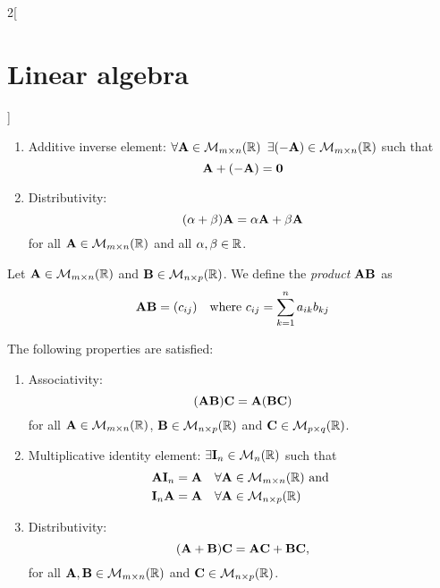 \documentclass[../../../main.tex]{subfiles}
\begin{document}
\begin{multicols}{2}[\section{Linear algebra}]
\begin{prop}
\begin{enumerate}
      \item Additive inverse element: $\forall\boldsymbol{\mathrm{A}}\in\mathcal{M}_{m\times n}(\mathbb{R})$ $\exists(-\boldsymbol{\mathrm{A}})\in\mathcal{M}_{m\times n}(\mathbb{R})$ such that $$\boldsymbol{\mathrm{A}}+(-\boldsymbol{\mathrm{A}})=\boldsymbol{\mathrm{0}}$$
      \item Distributivity: $$(\alpha+\beta)\boldsymbol{\mathrm{A}}=\alpha\boldsymbol{\mathrm{A}}+\beta\boldsymbol{\mathrm{A}}$$ for all $\boldsymbol{\mathrm{A}}\in\mathcal{M}_{m\times n}(\mathbb{R})$ and all $\alpha,\beta\in\mathbb{R}$.
    \end{enumerate}
  \end{prop}
  \begin{definition}
    Let $\boldsymbol{\mathrm{A}}\in\mathcal{M}_{m\times n}(\mathbb{R})$ and $\boldsymbol{\mathrm{B}}\in\mathcal{M}_{n\times p}(\mathbb{R})$. We define the \textit{product $\boldsymbol{\mathrm{A}}\boldsymbol{\mathrm{B}}$} as $$\boldsymbol{\mathrm{A}}\boldsymbol{\mathrm{B}}=(c_{ij})\quad\text{where }c_{ij}=\sum_{k=1}^na_{ik}b_{kj}$$
  \end{definition}
  \begin{prop}
    The following properties are satisfied:
    \begin{enumerate}
      \item Associativity: $$(\boldsymbol{\mathrm{A}}\boldsymbol{\mathrm{B}})\boldsymbol{\mathrm{C}}=\boldsymbol{\mathrm{A}}(\boldsymbol{\mathrm{B}}\boldsymbol{\mathrm{C}})$$ for all $\boldsymbol{\mathrm{A}}\in\mathcal{M}_{m\times n}(\mathbb{R})$, $\boldsymbol{\mathrm{B}}\in\mathcal{M}_{n\times p}(\mathbb{R})$ and $\boldsymbol{\mathrm{C}}\in\mathcal{M}_{p\times q}(\mathbb{R})$.
      \item Multiplicative identity element: $\exists\boldsymbol{\mathrm{I}}_n\in\mathcal{M}_n(\mathbb{R})$ such that
            \begin{align*}
               & \boldsymbol{\mathrm{A}}\boldsymbol{\mathrm{I}}_n=\boldsymbol{\mathrm{A}}\quad\forall\boldsymbol{\mathrm{A}}\in\mathcal{M}_{m\times n}(\mathbb{R})\text{ and } \\
               & \boldsymbol{\mathrm{I}}_n\boldsymbol{\mathrm{A}}=\boldsymbol{\mathrm{A}}\quad\forall\boldsymbol{\mathrm{A}}\in\mathcal{M}_{n\times p}(\mathbb{R})
            \end{align*}
      \item Distributivity: $$(\boldsymbol{\mathrm{A}}+\boldsymbol{\mathrm{B}})\boldsymbol{\mathrm{C}}=\boldsymbol{\mathrm{A}}\boldsymbol{\mathrm{C}}+\boldsymbol{\mathrm{B}}\boldsymbol{\mathrm{C}},$$ for all $\boldsymbol{\mathrm{A}},\boldsymbol{\mathrm{B}}\in\mathcal{M}_{m\times n}(\mathbb{R})$ and $\boldsymbol{\mathrm{C}}\in\mathcal{M}_{n\times p}(\mathbb{R})$.
    \end{enumerate}
  \end{prop}

\end{multicols}
\end{document}
